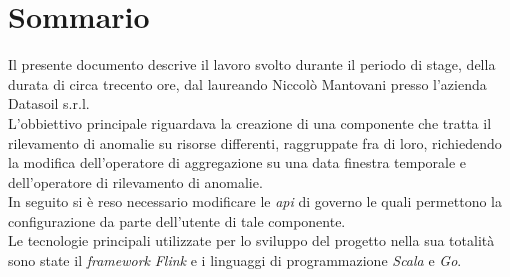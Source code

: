 
\cleardoublepage
{}
{}
\begingroup
\let\clearpage\relax
\let\cleardoublepage\relax
\let\cleardoublepage\relax

\chapter*{Sommario}

Il presente documento descrive il lavoro svolto durante il periodo di stage, della durata di circa trecento ore, dal laureando Niccolò Mantovani presso l'azienda Datasoil s.r.l.\\
L'obbiettivo principale riguardava la creazione di una componente che tratta il rilevamento di anomalie su risorse differenti, raggruppate fra di loro, richiedendo la modifica dell'operatore di aggregazione su una data finestra temporale e dell'operatore di rilevamento di anomalie.\\
In seguito si è reso necessario modificare le \textit{\gls{api}} di governo le quali permettono la configurazione da parte dell'utente di tale componente.\\
Le tecnologie principali utilizzate per lo sviluppo del progetto nella sua totalità sono state il \textit{\textit{\gls{framework}}} \textit{Flink} e i linguaggi di programmazione \textit{Scala} e \textit{Go}.

%
%

\endgroup			

\vfill

